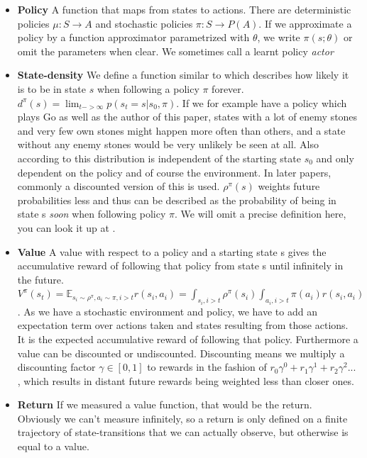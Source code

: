 \documentclass[hyperref,final,beleg]{cgvpub}
\begin{document}
\begin{itemize}
  \item \textbf{Policy} A function that maps from states to actions. There are deterministic policies $\mu: S \rightarrow A$ and stochastic policies $\pi: S \rightarrow P(A)$. If we approximate a policy by a function approximator parametrized with $\theta$, we write $\pi(s;\theta)$ or omit the parameters when clear. We sometimes call a learnt policy \textit{actor}
  \item \textbf{State-density} We define a function similar to \cite{suttonPolicyGradientMethods} which describes how likely it is to be in state $s$ when following a policy $\pi$ forever. $d^{\pi}(s) = \lim_{t -> \infty} p(s_t = s | s_0, \pi)$. If we for example have a policy which plays Go as well as the author of this paper, states with a lot of enemy stones and very few own stones might happen more often than others, and a state without any enemy stones would be very unlikely be seen at all. Also according to \cite{suttonPolicyGradientMethods} this distribution is independent of the starting state $s_0$ and only dependent on the policy and of course the environment. In later papers, commonly a discounted version of this is used. $\rho^{\pi}(s)$ weights future probabilities less and thus can be described as the probability of being in state s \textit{soon} when following policy $\pi$. We will omit a precise definition here, you can look it up at \cite[Section 2.1]{silverDeterministicPolicyGradient2013}.
  \item \textbf{Value} A value with respect to a policy and a starting state s gives the accumulative reward of following that policy from state s until infinitely in the future. $V^{\pi}(s_t) = \mathbb{E}_{s_i \sim \rho^{\pi}, a_i \sim \pi, i>t} r(s_i, a_i) = \int_{s_i, i>t} \rho^{\pi}(s_i) \int_{a_i, i>t} \pi(a_i) r(s_i, a_i) $. As we have a stochastic environment and policy, we have to add an expectation term over actions taken and states resulting from those actions. It is the expected accumulative reward of following that policy. Furthermore a value can be discounted or undiscounted. Discounting means we multiply a discounting factor $\gamma \in [0,1]$ to rewards in the fashion of $r_0 \gamma^0 + r_1 \gamma^1 + r_2 \gamma^2 ...$, which results in distant future rewards being weighted less than closer ones.
  \item \textbf{Return} If we measured a value function, that would be the return. Obviously we can't measure infinitely, so a return is only defined on a finite trajectory of state-transitions that we can actually observe, but otherwise is equal to a value.

\end{itemize}
\end{document}

